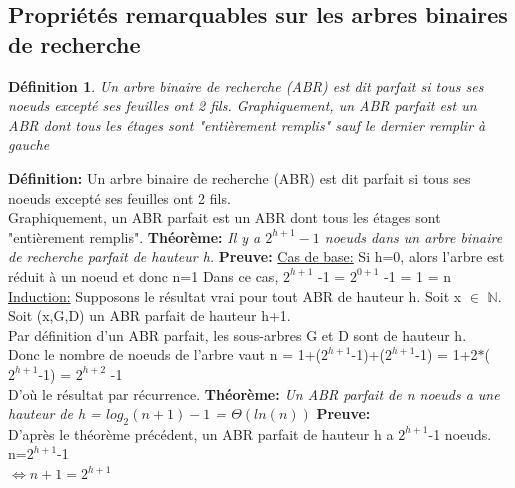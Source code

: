 \documentclass{report}
\newtheorem{def}{Définition}
\begin{document}
\subsection{Propriétés remarquables sur les arbres binaires de recherche}

\begin{def}
Un arbre binaire de recherche (ABR) est dit parfait si tous ses noeuds excepté ses feuilles ont 2 fils.
Graphiquement, un ABR parfait est un ABR dont tous les étages sont "entièrement remplis" sauf le dernier remplir à gauche
\end{def}
\textbf{Définition:}  Un arbre binaire de recherche (ABR) est dit parfait si tous ses noeuds excepté ses feuilles ont 2 fils. \\ Graphiquement, un ABR parfait est un ABR dont tous les étages sont "entièrement remplis". \newline\newline
\textbf{Théorème:}  \textit{Il y a $2^{h+1}-1$ noeuds dans un arbre binaire de recherche parfait de hauteur h.} \newline \newline
\textbf{Preuve:} \newline
\underline{Cas de base:} Si h=0, alors l'arbre est réduit à un noeud et donc n=1
Dans ce cas, $2^{h+1}$ -1 = $2^{0+1}$ -1 = 1 = n \newline \newline
\underline{Induction:} Supposons le résultat vrai pour tout ABR de hauteur h.
Soit x $\in$ $\mathbb{N}$. \\
Soit (x,G,D)  un ABR parfait de hauteur h+1.\\
Par définition d'un ABR parfait, les sous-arbres G et D sont de hauteur h. \\
Donc le nombre de noeuds de l'arbre vaut n = 1+($2^{h+1}$-1)+($2^{h+1}$-1) = 1+2$*$($2^{h+1}$-1) = $2^{h+2}$ -1 \\
D'où le résultat par récurrence. \newline \newline
\textbf{Théorème:}  \textit{Un ABR parfait de n noeuds a une hauteur de h = $log_2(n+1)-1$ = $\Theta(ln(n))$} \newline \newline
\textbf{Preuve:} \\
D'après le théorème précédent, un ABR parfait de hauteur h a $2^{h+1}$-1 noeuds. \\
n=$2^{h+1}$-1 \\
$\Leftrightarrow n+1 = 2^{h+1}$ \\
\end{document}
